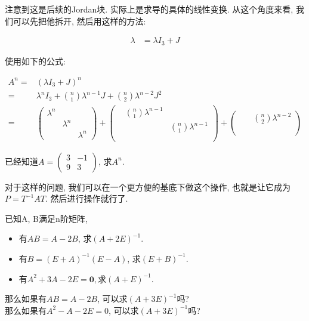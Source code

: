 \begin{sol*}
注意到这是后续的Jordan块. 实际上是求导的具体的线性变换. 从这个角度来看, 我们可以先把他拆开, 然后用这样的方法: 

\begin{align*}
\lambda & =\lambda I_{3}+J
\end{align*}

使用如下的公式: 

\begin{align*}
A^{n}= & (\lambda I_{3}+J)^{n}\\
= & \lambda^{n}I_{3}+{n \choose 1}\lambda^{n-1}J+{n \choose 2}\lambda^{n-2}J^{2}\\
= & \begin{pmatrix}\lambda^{n}\\
 & \lambda^{n}\\
 &  & \lambda^{n}
\end{pmatrix}+\begin{pmatrix} & {n \choose 1}\lambda^{n-1}\\
 &  & {n \choose 1}\lambda^{n-1}\\
\\
\end{pmatrix}+\begin{pmatrix} &  & {n \choose 2}\lambda^{n-2}\\
\\
\\
\end{pmatrix}
\end{align*}
\end{sol*}
\begin{problem}
已经知道$A=\begin{pmatrix}3 & -1\\
9 & 3
\end{pmatrix}$, 求$A^{n}$. 
\end{problem}

\begin{sol*}
对于这样的问题, 我们可以在一个更方便的基底下做这个操作, 也就是让它成为$P=T^{-1}AT$. 然后进行操作就行了. 
\end{sol*}
\begin{problem}
\label{prob:total-inversion}已知A, B满足n阶矩阵, 
\begin{itemize}
\item 有$AB=A-2B$, 求$(A+2E)^{-1}$.
\item 有$B=(E+A)^{-1}(E-A)$, 求$(E+B)^{-1}$.
\item 有$A^{2}+3A-2E=\boldsymbol{0},$求$(A+E)^{-1}$.
\end{itemize}
那么如果有$AB=A-2B$, 可以求$(A+3E)^{-1}$吗?\\
那么如果有$A^{2}-A-2E=0$, 可以求$(A+3E)^{-1}$吗?

\end{problem}

